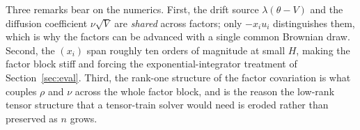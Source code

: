 \documentclass[preprint,12pt]{elsarticle}
\begin{document}
Three remarks bear on the numerics. First, the drift source
$\lambda(\theta-V)$ and the diffusion coefficient $\nu\sqrt{V}$ are
\emph{shared} across factors; only $-x_iu_i$ distinguishes them, which is why
the factors can be advanced with a single common Brownian draw. Second, the
$(x_i)$ span roughly ten orders of magnitude at small $H$, making the factor
block stiff and forcing the exponential-integrator treatment of
Section~\ref{sec:eval}. Third, the rank-one structure of the factor covariation
is what couples $\rho$ and $\nu$ across the whole factor block, and is the
reason the low-rank tensor structure that a tensor-train solver would need is
eroded rather than preserved as $n$ grows.



\end{document}
